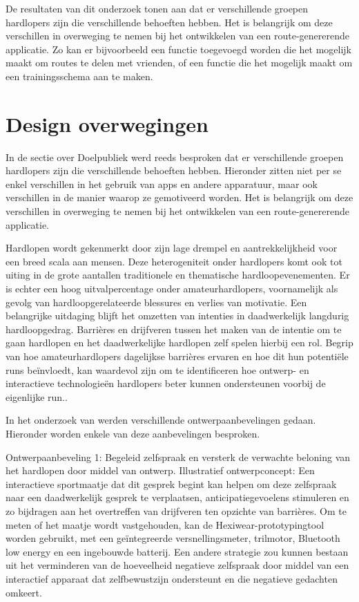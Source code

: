     De resultaten van dit onderzoek tonen aan dat er verschillende groepen hardlopers zijn die verschillende behoeften hebben. 
    Het is belangrijk om deze verschillen in overweging te nemen bij het ontwikkelen van een route-genererende applicatie.
    Zo kan er bijvoorbeeld een functie toegevoegd worden die het mogelijk maakt om routes te delen met vrienden,
    of een functie die het mogelijk maakt om een trainingsschema aan te maken.

    \section{Design overwegingen}

    In de sectie over Doelpubliek werd reeds besproken dat er verschillende groepen hardlopers zijn die verschillende behoeften hebben.
    Hieronder zitten niet per se enkel verschillen in het gebruik van apps en andere apparatuur, maar ook verschillen in de manier waarop ze gemotiveerd worden.
    Het is belangrijk om deze verschillen in overweging te nemen bij het ontwikkelen van een route-genererende applicatie.


    Hardlopen wordt gekenmerkt door zijn lage drempel en aantrekkelijkheid voor een breed scala aan mensen. 
    Deze heterogeniteit onder hardlopers komt ook tot uiting in de grote aantallen traditionele en thematische hardloopevenementen. 
    Er is echter een hoog uitvalpercentage onder amateurhardlopers, voornamelijk als gevolg van hardloopgerelateerde blessures en verlies van motivatie. 
    Een belangrijke uitdaging blijft het omzetten van intenties in daadwerkelijk langdurig hardloopgedrag. 
    Barrières en drijfveren tussen het maken van de intentie om te gaan hardlopen en het daadwerkelijke hardlopen zelf spelen hierbij een rol. 
    Begrip van hoe amateurhardlopers dagelijkse barrières ervaren en hoe dit hun potentiële runs beïnvloedt, kan waardevol zijn 
    om te identificeren hoe ontwerp- en interactieve technologieën hardlopers beter kunnen ondersteunen voorbij de eigenlijke run.\textcite{Menheere2020}.


    In het onderzoek van \textcite{Menheere2020} werden verschillende ontwerpaanbevelingen gedaan. Hieronder worden enkele van deze aanbevelingen besproken.


    Ontwerpaanbeveling 1: Begeleid zelfspraak en versterk de verwachte beloning van het hardlopen door middel van ontwerp. 
    Illustratief ontwerpconcept: Een interactieve sportmaatje dat dit gesprek begint kan helpen om deze zelfspraak naar een daadwerkelijk gesprek te verplaatsen, 
    anticipatiegevoelens stimuleren en zo bijdragen aan het overtreffen van drijfveren ten opzichte van barrières. 
    Om te meten of het maatje wordt vastgehouden, kan de Hexiwear-prototypingtool worden gebruikt, met een geïntegreerde versnellingsmeter, 
    trilmotor, Bluetooth low energy en een ingebouwde batterij. Een andere strategie zou kunnen bestaan uit het verminderen van de hoeveelheid 
    negatieve zelfspraak door middel van een interactief apparaat dat zelfbewustzijn ondersteunt en die negatieve gedachten omkeert.


